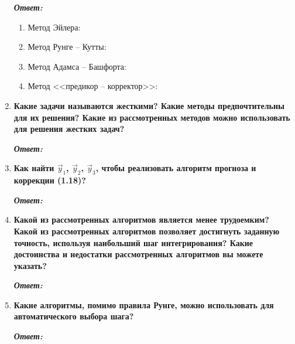 \documentclass[12pt, a4paper]{article}
\begin{document}
\begin{enumerate}
		\textit{\textbf{Ответ:}}
		
		\begin{enumerate}
			\item Метод Эйлера:
			\item Метод Рунге -- Кутты:
			\item Метод Адамса -- Башфорта:
			\item Метод <<предикор -- корректор>>:
		\end{enumerate}
		
		\item \textbf{Какие задачи называются жесткими? Какие методы предпочтительны для их решения? Какие из рассмотренных методов можно использовать для решения жестких задач?}
		\vspace*{0.2cm}
		
		\textit{\textbf{Ответ:}}
		
		\item \textbf{Как найти $\vec{y}_1$, $\vec{y}_2$, $\vec{y}_3$, чтобы реализовать алгоритм прогноза и коррекции (1.18)?}
		\vspace*{0.2cm}
		
		\textit{\textbf{Ответ:}}
		
		
		
		\item \textbf{ Какой из рассмотренных алгоритмов является менее трудоемким? Какой из рассмотренных алгоритмов позволяет достигнуть заданную точность, используя наибольший шаг интегрирования? Какие достоинства и недостатки рассмотренных алгоритмов вы можете указать?}
		\vspace*{0.2cm}
		
		\textit{\textbf{Ответ:}}
		
		\item \textbf{Какие алгоритмы, помимо правила Рунге, можно использовать для автоматического выбора шага?}
		\vspace*{0.2cm}
		
		\textit{\textbf{Ответ:}}
	
	\end{enumerate}

	
	
	
	
\end{document}
